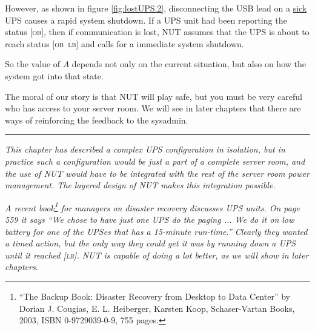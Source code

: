 \documentclass[12pt]{article}
\newcommand{\LB}{\textcolor{UPSDCOLOUR}{\textsc{lb}}}
\newcommand{\OB}{\textcolor{UPSDCOLOUR}{\textsc{ob}}}
\newcommand{\status}[1]{\textcolor{UPSDCOLOUR}{[{#1}]}}
\begin{document}
However, as shown in figure \ref{fig:lostUPS.2}, disconnecting the USB lead on
a \underline{sick} UPS causes a rapid system shutdown.  If a UPS unit had been
reporting the status \status{\OB}, then if communication is lost, NUT assumes
that the UPS is about to reach status \status {\OB\ \LB} and calls for a immediate
system shutdown.

So the value of $A$ depends not only on the current situation, but also on how
the system got into that state.

The moral of our story is that NUT will play safe, but you must be very
careful who has access to your server room.  We will see in later chapters
that there are ways of reinforcing the feedback to the sysadmin.

\vspace*{\fill}
\begin{center}\rule{\LinePrinterwidth}{0.5mm}\end{center}
\vspace*{\fill}

\textsl{This chapter has described a complex UPS configuration in isolation,
  but in practice such a configuration would be just a part of a complete
  server room, and the use of NUT would have to be integrated with the rest of
  the server room power management.  The layered design of NUT makes this
  integration possible.}



\vspace*{\fill}

\begin{center}
\end{center}

\vspace*{\fill}

\textsl{A recent book\footnote{``The Backup Book: Disaster Recovery from
    Desktop to Data Center'' by Dorian J. Cougias, E. L. Heiberger, Karsten
    Koop, Schaser-Vartan Books, 2003, ISBN 0-9729039-0-9, 755 pages.}  for
  managers on disaster recovery discusses UPS units.  On page 559 it says ``We
  chose to have just one UPS do the paging ... We do it on low battery for one
  of the UPSes that has a 15-minute run-time.''  Clearly they wanted a timed
  action, but the only way they could get it was by running down a UPS until
  it reached \status{\LB}.  NUT is capable of doing a lot better, as we will
  show in later chapters.}

\vspace*{\fill}
\end{document}
